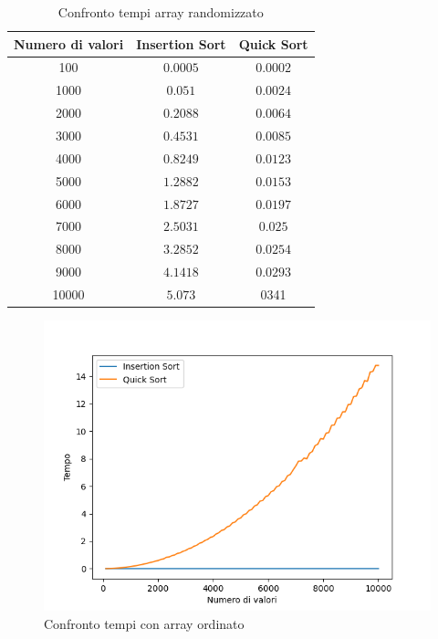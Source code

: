 \documentclass[
]{article}
\begin{document}
\begin{table}[h!]
    \begin{center}
        \begin{tabular}{|c|c|c|}
            \hline \hline Numero di valori & Insertion Sort & Quick Sort \\
            \hline \hline 100              & $0.0005$       & $0.0002$   \\
            \hline 1000                    & $0.051$        & $0.0024$   \\
            \hline 2000                    & $0.2088$       & $0.0064$   \\
            \hline 3000                    & $0.4531$       & $0.0085$   \\
            \hline 4000                    & $0.8249$       & $0.0123$   \\
            \hline 5000                    & $1.2882$       & $0.0153$   \\
            \hline 6000                    & $1.8727$       & $0.0197$   \\
            \hline 7000                    & $2.5031$       & $0.025$    \\
            \hline 8000                    & $3.2852$       & $0.0254$   \\
            \hline 9000                    & $4.1418$       & $0.0293$   \\
            \hline 10000                   & $5.073$        & 0341       \\
            \hline \hline
        \end{tabular}
    \end{center}
    \caption{Confronto tempi array randomizzato}
\end{table}
\newpage
\begin{figure}[h!]
    \centering
    \includegraphics{../img/ord/ord_comparison10000.png}
    \caption{Confronto tempi con array ordinato}
\end{figure}
\end{document}
